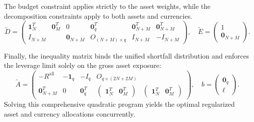 The budget constraint applies strictly to the asset weights, while the decomposition constraints apply to both assets and currencies. 
\begin{equation*}
    \tilde{D} = \begin{pmatrix} 
    \mathbf{1}_N^T & \mathbf{0}_M^T & 0 & \mathbf{0}_q^T & \mathbf{0}_{N+M}^T & \mathbf{0}_{N+M}^T \\ 
    I_{N+M} & & \mathbf{0}_{N+M} & O_{(N+M) \times q} & I_{N+M} & -I_{N+M} 
    \end{pmatrix}, \quad 
    \tilde{E} = \begin{pmatrix} 1 \\ \mathbf{0}_{N+M} \end{pmatrix}.
\end{equation*}

Finally, the inequality matrix binds the unified shortfall distribution and enforces the leverage limit solely on the gross asset exposure:
\begin{equation*}
    \tilde{A} = \begin{pmatrix} 
    -R^{\text{all}} & -\mathbf{1}_q & -I_q & O_{q \times (2N+2M)} \\
    \mathbf{0}_{N+M}^T & 0 & \mathbf{0}_q^T & \begin{pmatrix} \mathbf{1}_N^T & \mathbf{0}_M^T \end{pmatrix} & \begin{pmatrix} \mathbf{1}_N^T & \mathbf{0}_M^T \end{pmatrix}
    \end{pmatrix}, \quad 
    b = \begin{pmatrix} \mathbf{0}_q \\ \ell \end{pmatrix}.
\end{equation*}
Solving this comprehensive quadratic program yields the optimal regularized asset and currency allocations concurrently.


